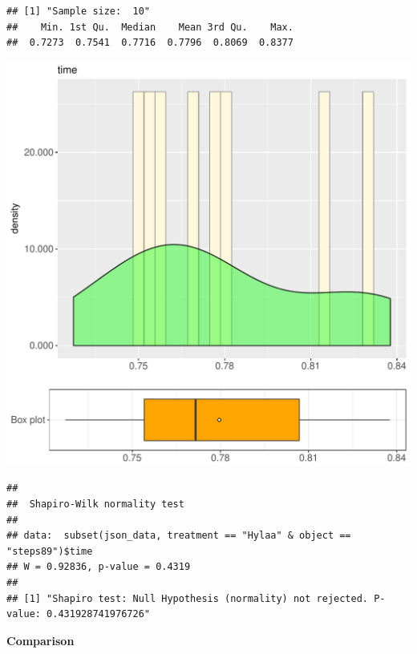 \documentclass{article}\usepackage[]{graphicx}\usepackage[]{color}
\makeatletter
\def\maxwidth{ %
  \ifdim\Gin@nat@width>\linewidth
    \linewidth
  \else
    \Gin@nat@width
  \fi
}
\newenvironment{kframe}{%
 \def\at@end@of@kframe{}%
 \ifinner\ifhmode%
  \def\at@end@of@kframe{\end{minipage}}%
  \begin{minipage}{\columnwidth}%
 \fi\fi%
 \def\FrameCommand##1{\hskip\@totalleftmargin \hskip-\fboxsep
 \colorbox{shadecolor}{##1}\hskip-\fboxsep
     \hskip-\linewidth \hskip-\@totalleftmargin \hskip\columnwidth}%
 \MakeFramed {\advance\hsize-\width
   \@totalleftmargin\z@ \linewidth\hsize
   \@setminipage}}%
 {\par\unskip\endMakeFramed%
 \at@end@of@kframe}
\newenvironment{knitrout}{}{} %
\makeatother
\begin{document}
\begin{knitrout}
\color{fgcolor}\begin{kframe}
\begin{verbatim}
## [1] "Sample size:  10"
##    Min. 1st Qu.  Median    Mean 3rd Qu.    Max. 
##  0.7273  0.7541  0.7716  0.7796  0.8069  0.8377
\end{verbatim}
\end{kframe}
\includegraphics[width=\maxwidth]{figure/RH2_Hylaa_steps89-1} 
\begin{kframe}\begin{verbatim}
## 
## 	Shapiro-Wilk normality test
## 
## data:  subset(json_data, treatment == "Hylaa" & object == "steps89")$time
## W = 0.92836, p-value = 0.4319
## 
## [1] "Shapiro test: Null Hypothesis (normality) not rejected. P-value: 0.431928741976726"
\end{verbatim}
\end{kframe}
\end{knitrout}
  
 \textbf{Comparison}
  
\end{document}
